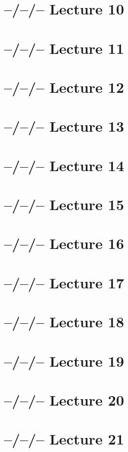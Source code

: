 \documentclass{article}
\theoremstyle{definition}
\begin{document}
\section{--/--/-- Lecture 10}

\section{--/--/-- Lecture 11}

\section{--/--/-- Lecture 12}

\section{--/--/-- Lecture 13}

\section{--/--/-- Lecture 14}

\section{--/--/-- Lecture 15}

\section{--/--/-- Lecture 16}

\section{--/--/-- Lecture 17}

\section{--/--/-- Lecture 18}

\section{--/--/-- Lecture 19}

\section{--/--/-- Lecture 20}

\section{--/--/-- Lecture 21}
\end{document}
